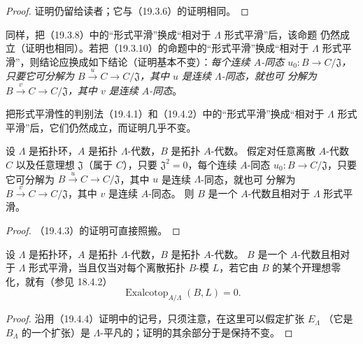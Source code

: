 \begin{proof}
证明仍留给读者；它与（19.3.6）的证明相同。
\end{proof}


\begin{env}[19.9.5]
\label{0.19.9.5-fr}
同样，把（19.3.8）中的“形式平滑”换成“相对于 $\Lambda$ 形式平滑”后，该命题
仍然成立（证明也相同）。若把（19.3.10）的命题中的“形式平滑”换成“相对于
$\Lambda$ 形式平滑”，则结论应换成如下结论（证明基本不变）：\emph{每个连续
$A$-同态 $u_0:B\to C/\mathfrak J$，只要它可分解为
$B\xrightarrow{u}C\to C/\mathfrak J$，其中 $u$ 是连续 $\Lambda$-同态，就也可
分解为 $B\xrightarrow{v}C\to C/\mathfrak J$，其中 $v$ 是连续 $A$-同态}。
\end{env}

\begin{env}[19.9.6]
\label{0.19.9.6-fr}
把形式平滑性的判别法（19.4.1）和（19.4.2）中的“形式平滑”换成“相对于
$\Lambda$ 形式平滑”后，它们仍然成立，而证明几乎不变。
\end{env}

\begin{proposition}[19.9.7]
\label{0.19.9.7-fr}
设 $\Lambda$ 是拓扑环，$A$ 是拓扑 $\Lambda$-代数，$B$ 是拓扑 $A$-代数。
假定对任意离散 $A$-代数 $C$ 以及任意理想 $\mathfrak J$（属于 $C$），只要
$\mathfrak J^2=0$，每个连续 $A$-同态
$u_0:B\to C/\mathfrak J$，只要它可分解为
$B\xrightarrow{u}C\to C/\mathfrak J$，其中 $u$ 是连续 $\Lambda$-同态，就也可
分解为 $B\xrightarrow{v}C\to C/\mathfrak J$，其中 $v$ 是连续 $A$-同态。
则 $B$ 是一个 $A$-代数且相对于 $\Lambda$ 形式平滑。
\end{proposition}

\begin{proof}
（19.4.3）的证明可直接照搬。
\end{proof}

\begin{proposition}[19.9.8]
\label{0.19.9.8-fr}
设 $\Lambda$ 是拓扑环，$A$ 是拓扑 $\Lambda$-代数，$B$ 是拓扑 $A$-代数。
$B$ 是一个 $A$-代数且相对于 $\Lambda$ 形式平滑，当且仅当对每个离散拓扑
$B$-模 $L$，若它由 $B$ 的某个开理想零化，就有（参见 18.4.2）
\[
  \operatorname{Exalcotop}_{A/\Lambda}(B,L)=0.
\]
\end{proposition}

\begin{proof}
沿用（19.4.4）证明中的记号，只须注意，在这里可以假定扩张 $E_\Lambda$
（它是 $B_\Lambda$ 的一个扩张）是 $\Lambda$-平凡的；证明的其余部分于是保持不变。
\end{proof}

